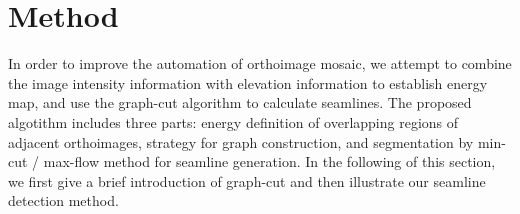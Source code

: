 \documentclass[journal]{IEEEtran}
\begin{document}
\section{Method}
In order to improve the automation of orthoimage mosaic, we attempt to combine the image intensity information with elevation information to establish energy map, and use the graph-cut algorithm to calculate seamlines. The proposed algotithm includes three parts:  energy definition of overlapping regions of adjacent orthoimages, strategy for graph construction, and segmentation by min-cut / max-flow method for seamline generation. In the following of this section, we first give a brief introduction of graph-cut and then illustrate our seamline detection method.\par

\end{document}
